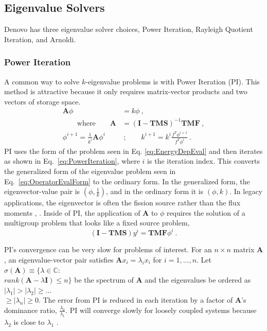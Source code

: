 \documentclass[preprint,12pt]{elsarticle}
\newcommand{\ve}[1]{\ensuremath{\mathbf{#1}}}
\begin{document}
\subsection{Eigenvalue Solvers}
\label{sec:eigenvalue}
Denovo has three eigenvalue solver choices, Power Iteration, Rayleigh Quotient Iteration, and Arnoldi. 

\subsubsection{Power Iteration}
A common way to solve $k$-eigenvalue problems is with Power Iteration (PI). This method is attractive because it only requires matrix-vector products and two vectors of storage space. 
%
\begin{align}
  \ve{A}\phi &= k\phi \:, \label{eq:EnergyDepEval} \\
  \qquad \text{where}  \qquad \ve{A} &= (\ve{I} - \ve{TMS})^{-1} \ve{TMF} \:, \nonumber \\
  \phi^{i+1} = \frac{1}{k^i}\ve{A}\phi^{i} &\:; \qquad 
  k^{i+1} = k^i \frac{f^T \phi^{i+1}}{f^T \phi^i} \:.
  \label{eq:PowerIteration}
\end{align} 
%
PI uses the form of the problem seen in Eq. \eqref{eq:EnergyDepEval} and then iterates as shown in Eq.\ \eqref{eq:PowerIteration}, where $i$ is the iteration index. This converts the generalized form of the eigenvalue problem seen in Eq.\ \eqref{eq:OperatorEvalForm} to the ordinary form. In the generalized form, the eigenvector-value pair is $(\phi, \frac{1}{k})$, and in the ordinary form it is $(\phi, k)$. 
In legacy applications, the eigenvector is often the fission source rather than the flux moments \cite{Evans2011}, \cite{Lewis1993}.
Inside of PI, the application of $\ve{A}$ to $\phi$ requires the solution of a multigroup problem that looks like a fixed source problem,
\begin{equation}
  (\ve{I} - \ve{TMS})y^{i} = \ve{TMF}\phi^{i} \:. \label{eq:EvalDepFxdSource}
\end{equation}

PI's convergence can be very slow for problems of interest. For an $n \times n$ matrix $\ve{A}$, an eigenvalue-vector pair satisfies $\ve{A}x_{i} = \lambda_{i}x_{i}$ for $i = 1,...,n$. Let $\sigma(\ve{A}) \equiv \{\lambda \in \mathbb{C} : $\\$ rank(\ve{A} - \lambda \ve{I}) \le n\}$ be the spectrum of $\ve{A}$ and the eigenvalues be ordered as $|\lambda_{1}| > |\lambda_{2}| \ge \dots $\\$\ge |\lambda_{n}| \ge 0$. The error from PI is reduced in each iteration by a factor of $\ve{A}$'s dominance ratio, $\frac{\lambda_{2}}{\lambda_{1}}$. PI will converge slowly for loosely coupled systems because $\lambda_{2}$ is close to $\lambda_{1}$ \cite{Trefethen1997}. 
\end{document}
